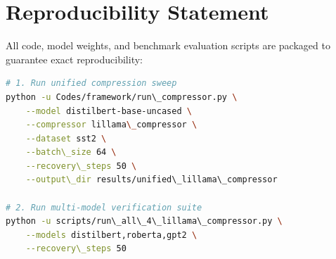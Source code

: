 \section{Reproducibility Statement}
All code, model weights, and benchmark evaluation scripts are packaged to guarantee exact reproducibility:
\begin{lstlisting}[language=bash]
# 1. Run unified compression sweep
python -u Codes/framework/run\_compressor.py \
    --model distilbert-base-uncased \
    --compressor lillama\_compressor \
    --dataset sst2 \
    --batch\_size 64 \
    --recovery\_steps 50 \
    --output\_dir results/unified\_lillama\_compressor

# 2. Run multi-model verification suite
python -u scripts/run\_all\_4\_lillama\_compressor.py \
    --models distilbert,roberta,gpt2 \
    --recovery\_steps 50
\end{lstlisting}
